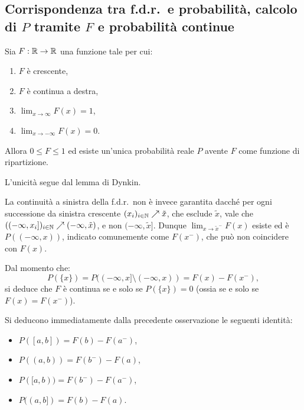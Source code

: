 \begin{multicols*}{2}
\subsection{Corrispondenza tra f.d.r.~e probabilità, calcolo di \texorpdfstring{$P$}{P} tramite \texorpdfstring{$F$}{F} e probabilità continue}

\begin{proposition}
    \label{prop:unicita_fdr}
    Sia $F : \mathbb{R} \to \mathbb{R}$ una funzione tale per cui:
    \begin{enumerate}[(i.)]
        \item $F$ è crescente,
        \item $F$ è continua a destra,
        \item $\lim_{x \to \infty} F(x) = 1$,
        \item $\lim_{x \to -\infty} F(x) = 0$.
    \end{enumerate}
    Allora $0 \leq F \leq 1$ ed esiste un'unica probabilità reale $P$ avente
    $F$ come funzione di ripartizione. \smallskip


    L'unicità segue dal lemma di Dynkin.
\end{proposition}

\begin{remark}
    La continuità a sinistra della f.d.r.~non è invece garantita dacché per ogni successione da sinistra crescente
    $(x_i)_{i \in \mathbb{N}} \nearrow \tilde{x}$, che esclude $\tilde{x}$,
    vale che $((-\infty, x_i])_{i \in \mathbb{N}} \nearrow (-\infty, \tilde{x})$, e non
    $(-\infty, \tilde{x}]$. Dunque $\lim_{x \to \tilde{x}^-} F(x)$ esiste ed è $P((-\infty, x))$, indicato
    comunemente come $F(x^-)$, che può non coincidere con $F(x)$. \smallskip

    Dal momento che:
    \[
        P(\{x\}) = P((-\infty, x] \setminus (-\infty, x)) = F(x) - F(x^-),
    \]
    si deduce che $F$ è continua se e solo se $P(\{x\}) = 0$ (ossia se e solo se
    $F(x) = F(x^-)$).
\end{remark}

\begin{remark}
    Si deducono immediatamente dalla precedente osservazione le seguenti identità:
    \begin{itemize}
        \item $P([a, b]) = F(b) - F(a^-)$,
        \item $P((a, b)) = F(b^-) - F(a)$,
        \item $P([a, b)) = F(b^-) - F(a^-)$,
        \item $P((a, b]) = F(b) - F(a)$.
    \end{itemize} 
\end{remark}


\end{multicols*}
